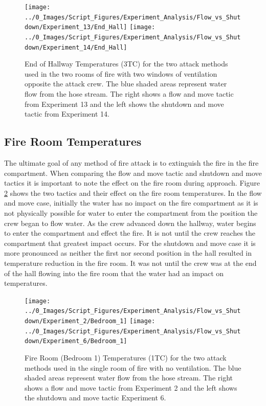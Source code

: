 \documentclass[12pt,oneside]{book}
\begin{document}
\begin{figure}[H]
\centering
\texttt{[image: ../0\_Images/Script\_Figures/Experiment\_Analysis/Flow\_vs\_Shutdown/Experiment\_13/End\_Hall]}
\texttt{[image: ../0\_Images/Script\_Figures/Experiment\_Analysis/Flow\_vs\_Shutdown/Experiment\_14/End\_Hall]}
\caption[Two Room - Two Vents Opposite - Flow \& Move vs. Shutdown \& Move - Temperature]{End of Hallway Temperatures (3TC) for the two attack methods used in the two rooms of fire with two windows of ventilation opposite the attack crew. The blue shaded areas represent water flow from the hose stream. The right shows a flow and move tactic from Experiment 13 and the left shows the shutdown and move tactic from Experiment 14.}
\label{fig:Flow_vs_Shut_Two_Vent}
\end{figure}

\subsection{Fire Room Temperatures}
The ultimate goal of any method of fire attack is to extinguish the fire in the fire compartment. When comparing the flow and move tactic and shutdown and move tactics it is important to note the effect on the fire room during approach. Figure \ref{fig:Flow_vs_Shut_Single_No_Vent_Fire_Temp} shows the two tactics and their effect on the fire room temperatures. In the flow and move case, initially the water has no impact on the fire compartment as it is not physically possible for water to enter the compartment from the position the crew began to flow water. As the crew advanced down the hallway, water begins to enter the compartment and effect the fire. It is not until the crew reaches the compartment that greatest impact occurs. For the shutdown and move case it is more pronounced as neither the first nor second position in the hall resulted in temperature reduction in the fire room. It was not until the crew was at the end of the hall flowing into the fire room that the water had an impact on temperatures. 

\begin{figure}[H]
\centering
\texttt{[image: ../0\_Images/Script\_Figures/Experiment\_Analysis/Flow\_vs\_Shutdown/Experiment\_2/Bedroom\_1]}
\texttt{[image: ../0\_Images/Script\_Figures/Experiment\_Analysis/Flow\_vs\_Shutdown/Experiment\_6/Bedroom\_1]}
\caption[Single Room - No Vent - Flow \& Move vs. Shutdown \& Move - Bedroom 1 Temperature]{Fire Room (Bedroom 1) Temperatures (1TC) for the two attack methods used in the single room of fire with no ventilation. The blue shaded areas represent water flow from the hose stream. The right shows a flow and move tactic from Experiment 2 and the left shows the shutdown and move tactic Experiment 6.}
\label{fig:Flow_vs_Shut_Single_No_Vent_Fire_Temp}
\end{figure}
\end{document}
